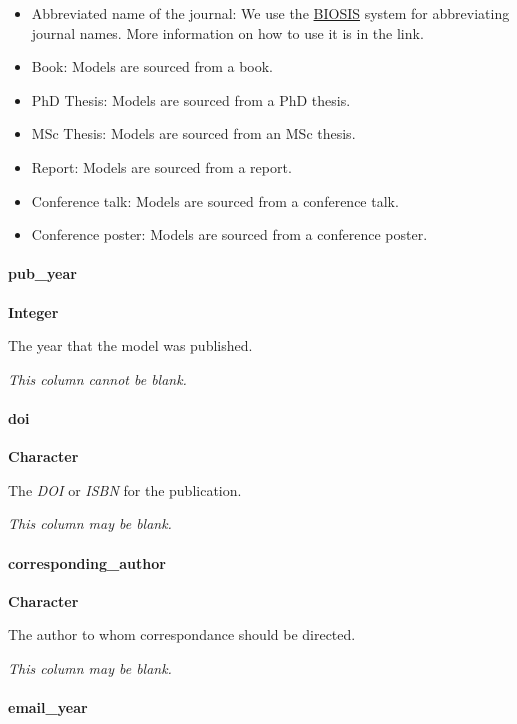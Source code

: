 \documentclass[]{article}
\let\oldparagraph\paragraph
\renewcommand{\paragraph}[1]{\oldparagraph{#1}\mbox{}}
\begin{document}
\begin{itemize}
\item
  Abbreviated name of the journal: We use the
  \href{http://cms.library.illinois.edu/export/biotech/j-abbrev.html}{BIOSIS}
  system for abbreviating journal names. More information on how to use
  it is in the link.
\item
  Book: Models are sourced from a book.
\item
  PhD Thesis: Models are sourced from a PhD thesis.
\item
  MSc Thesis: Models are sourced from an MSc thesis.
\item
  Report: Models are sourced from a report.
\item
  Conference talk: Models are sourced from a conference talk.
\item
  Conference poster: Models are sourced from a conference poster.
\end{itemize}

\paragraph{pub\_year}\label{pub_year}

\textbf{Integer}

The year that the model was published.

\emph{This column cannot be blank.}

\paragraph{doi}\label{doi}

\textbf{Character}

The \emph{DOI} or \emph{ISBN} for the publication.

\emph{This column may be blank.}

\paragraph{corresponding\_author}\label{corresponding_author}

\textbf{Character}

The author to whom correspondance should be directed.

\emph{This column may be blank.}

\paragraph{email\_year}\label{email_year}
\end{document}
